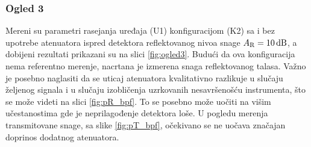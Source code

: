 \documentclass[a4paper, 12pt, diplomski]{etf}
\newcommand{\unit}[1]{\,{\rm #1}}
\begin{document}
\subsubsection{Ogled 3}
Mereni su parametri rasejanja uređaja (U1) 
konfiguracijom (K2) sa i bez upotrebe atenuatora  
ispred detektora reflektovanog nivoa snage
$A_{\rm R} = 10\unit{dB}$, a dobijeni rezultati 
prikazani su na slici \ref{fig:ogled3}. 
Budući da ova konfiguracija nema referentno
merenje, nacrtana je izmerena snaga reflektovanog
talasa. Važno je posebno naglasiti da se 
uticaj atenuatora kvalitativno razlikuje u 
slučaju željenog signala i u slučaju izobličenja
uzrkovanih nesavršenošću instrumenta, što se 
može videti na slici \ref{fig:pR_bpf}. To se 
posebno može uočiti na višim učestanostima 
gde je neprilagođenje detektora loše. 
U pogledu merenja transmitovane snage,
sa slike \ref{fig:pT_bpf}, očekivano se ne uočava
značajan doprinos dodatnog atenuatora.
\end{document}
